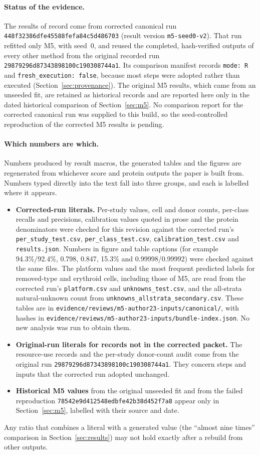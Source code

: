\documentclass[11pt]{article}
\newcommand{\runid}{\nolinkurl{448f32386dfe45588fefa84c5d486703}}
\newcommand{\origrunid}{\nolinkurl{29879296d87343898100c190308744a1}}
\newcommand{\failrunid}{\nolinkurl{78542e9d412548edbfe42b38d452f7a8}}
\newcommand{\code}[1]{\texttt{#1}}
\newif\ifctreport
\newcommand{\Reprostatus}{\ifctreport A seed-controlled reproduction of the corrected M5 results was run and compared with the corrected canonical run by the repository's tiered comparison; that internal comparison reports overall status ``\ctres{comparison}{report}{overall}''. This is an internal tolerance comparison by the same pipeline, not independent verification\else No comparison report for the corrected canonical run was supplied to this build, so the seed-controlled reproduction of the corrected M5 results is pending\fi}
\begin{document}
\paragraph{Status of the evidence.} The results of record come from corrected canonical run \runid{} (result version \code{m5-seed0-v2}). That run refitted only M5, with seed~0, and reused the completed, hash-verified outputs of every other method from the original recorded run \origrunid. Its comparison manifest records \verb|mode: R| and \verb|fresh_execution: false|, because most steps were adopted rather than executed (Section~\ref{sec:provenance}). The original M5 results, which came from an unseeded fit, are retained as historical records and are reported here only in the dated historical comparison of Section~\ref{sec:m5}. \Reprostatus.

\paragraph{Which numbers are which.} Numbers produced by result macros, the generated tables and the figures are regenerated from whichever score and protein outputs the paper is built from. Numbers typed directly into the text fall into three groups, and each is labelled where it appears.
\begin{itemize}
\item \textbf{Corrected-run literals.} Per-study values, cell and donor counts, per-class recalls and precisions, calibration values quoted in prose and the protein denominators were checked for this revision against the corrected run's \nolinkurl{per_study_test.csv}, \nolinkurl{per_class_test.csv}, \nolinkurl{calibration_test.csv} and \nolinkurl{results.json}. Numbers in figure and table captions (for example 94.3\%/92.4\%, 0.798, 0.847, 15.3\% and 0.99998/0.99992) were checked against the same files. The platform values and the most frequent predicted labels for removed-type and erythroid cells, including those of M5, are read from the corrected run's \nolinkurl{platform.csv} and \nolinkurl{unknowns_test.csv}, and the all-strata natural-unknown count from \nolinkurl{unknowns_allstrata_secondary.csv}. These tables are in \nolinkurl{evidence/reviews/m5-author23-inputs/canonical/}, with hashes in \nolinkurl{evidence/reviews/m5-author23-inputs/bundle-index.json}. No new analysis was run to obtain them.
\item \textbf{Original-run literals for records not in the corrected packet.} The resource-use records and the per-study donor-count audit come from the original run \origrunid. They concern steps and inputs that the corrected run adopted unchanged.
\item \textbf{Historical M5 values} from the original unseeded fit and from the failed reproduction \failrunid{} appear only in Section~\ref{sec:m5}, labelled with their source and date.
\end{itemize}
Any ratio that combines a literal with a generated value (the ``almost nine times'' comparison in Section~\ref{sec:results}) may not hold exactly after a rebuild from other outputs.
\end{document}

